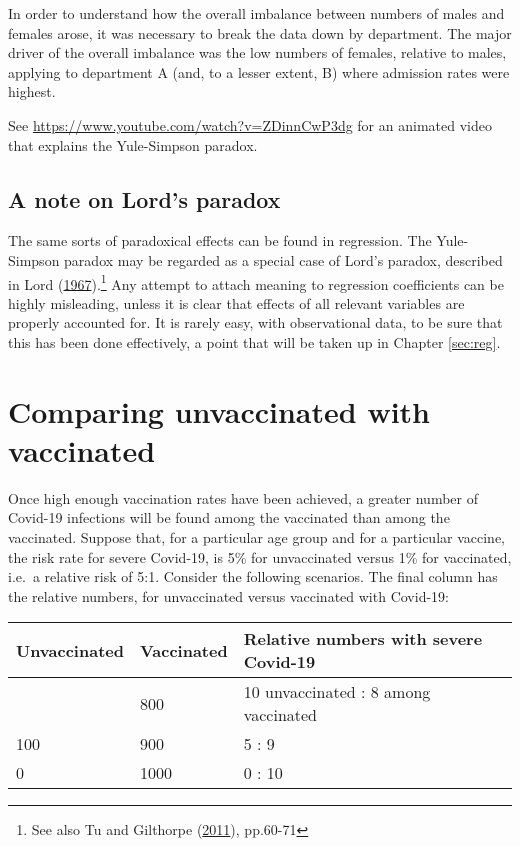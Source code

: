 \documentclass[
  10ptls,
  b5paper]{book}
\begin{document}
In order to understand how the overall imbalance between numbers of males and females arose, it was necessary to break the data down by department. The major driver of the overall imbalance was the low numbers of females, relative to males, applying to department A (and, to a lesser extent, B) where admission rates were highest.

See \url{https://www.youtube.com/watch?v=ZDinnCwP3dg} for an animated video that explains the Yule-Simpson paradox.

\hypertarget{a-note-on-lords-paradox}{%
\subsection*{A note on Lord's paradox}\label{a-note-on-lords-paradox}}

The same sorts of paradoxical effects can be found in regression. The Yule-Simpson paradox may be regarded as a special case of Lord's paradox, described in Lord (\protect\hyperlink{ref-lord1967paradox}{1967}).\footnote{See also Tu and Gilthorpe (\protect\hyperlink{ref-tu2011statistical}{2011}), pp.60-71} Any attempt to attach meaning to regression coefficients can be highly misleading, unless it is clear that effects of all relevant variables are properly accounted for. It is rarely easy, with observational data, to be sure that this has been done effectively, a point that will be taken up in Chapter \ref{sec:reg}.

\hypertarget{comparing-unvaccinated-with-vaccinated}{%
\section{Comparing unvaccinated with vaccinated}\label{comparing-unvaccinated-with-vaccinated}}

Once high enough vaccination rates have been achieved, a greater number of Covid-19 infections will be found among the vaccinated than among the vaccinated. Suppose that, for a particular age group and for a particular vaccine, the risk rate for severe Covid-19, is 5\% for unvaccinated versus 1\% for vaccinated, i.e.~a relative risk of 5:1. Consider the following scenarios. The final column has the relative numbers, for unvaccinated versus vaccinated with Covid-19:

\begin{longtable}[]{@{}lll@{}}
\toprule\noalign{}
Unvaccinated & Vaccinated & Relative numbers with severe Covid-19 \\
\midrule\noalign{}
\endhead
\bottomrule\noalign{}
\endlastfoot
200 & 800 & 10 unvaccinated : 8 among vaccinated \\
100 & 900 & 5 : 9 \\
0 & 1000 & 0 : 10 \\
\end{longtable}
\end{document}

